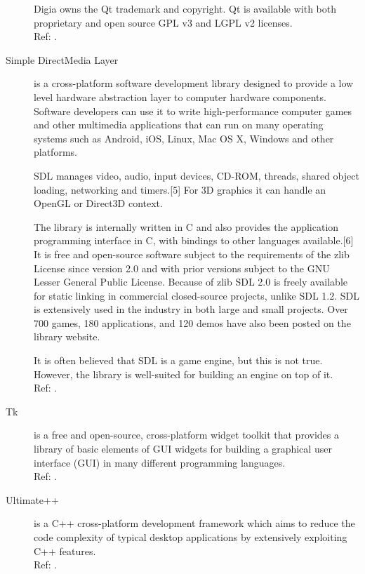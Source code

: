 \begin{description}
		Digia owns the Qt trademark and copyright. Qt is available with
		both proprietary and open source GPL v3 and LGPL v2 licenses.
		\hspace*{\fill}\\Ref: \cite{wiki:qt}.

    \item[Simple DirectMedia Layer] is a cross-platform software development
		library designed to provide a low level hardware abstraction
		layer to computer hardware components. Software developers
		can use it to write high-performance computer games and other
		multimedia applications that can run on many operating systems
		such as Android, iOS, Linux, Mac OS X, Windows and other platforms.

		SDL manages video, audio, input devices, CD-ROM, threads, shared
		object loading, networking and timers.[5] For 3D graphics it can
		handle an OpenGL or Direct3D context.

		The library is internally written in C and also provides the
		application programming interface in C, with bindings to other
		languages available.[6] It is free and open-source software subject
		to the requirements of the zlib License since version 2.0 and with
		prior versions subject to the GNU Lesser General Public License.
		Because of zlib SDL 2.0 is freely available for static linking
		in commercial closed-source projects, unlike SDL 1.2. SDL is
		extensively used in the industry in both large and small projects.
		Over 700 games, 180 applications, and 120 demos have also been
		posted on the library website.

		It is often believed that SDL is a game engine, but this is not
		true. However, the library is well-suited for building an engine
		on top of it.
		\hspace*{\fill}\\Ref: \cite{wiki:sdl}.
    \item[Tk]	is a free and open-source, cross-platform widget toolkit that
		provides a library of basic elements of GUI widgets for building
		a graphical user interface (GUI) in many different programming
		languages.
		\hspace*{\fill}\\Ref: \cite{wiki:tk}.
    \item[Ultimate++] is a C++ cross-platform development framework which aims
		to reduce the code complexity of typical desktop applications
		by extensively exploiting C++ features.
		\hspace*{\fill}\\Ref: \cite{wiki:ultimate++}.


\end{description}

